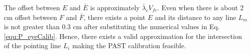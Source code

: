 The offset between $E$ and $\bar{E}$ is approximately $ \bar\lambda_c V_{fc}$. Even when there is about 2 cm offset between $F$ and $\bar{F}$, there exists a point $E$ and its distance to any line $L_m$ is not greater than 0.3 cm after substituting the numerical values in Eq.\ref{equ:P_eyeCalib}. Hence, there exists a valid approximation for the intersection of the pointing line $L_i$ making the PAST calibration feasible.


